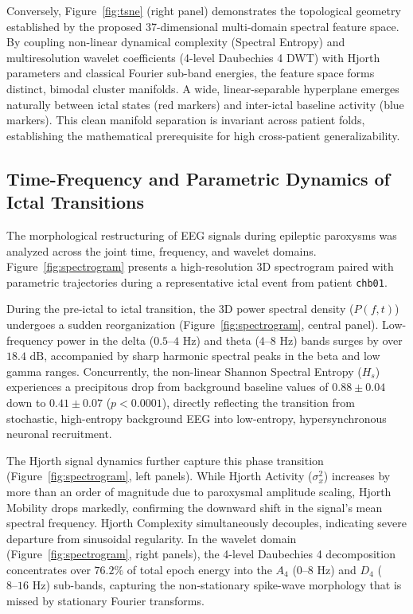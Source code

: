 \documentclass[pdflatex,sn-mathphys-num]{sn-jnl}
\begin{document}
Conversely, Figure~\ref{fig:tsne} (right panel) demonstrates the topological geometry established by the proposed 37-dimensional multi-domain spectral feature space. By coupling non-linear dynamical complexity (Spectral Entropy) and multiresolution wavelet coefficients (4-level Daubechies 4 DWT) with Hjorth parameters and classical Fourier sub-band energies, the feature space forms distinct, bimodal cluster manifolds. A wide, linear-separable hyperplane emerges naturally between ictal states (red markers) and inter-ictal baseline activity (blue markers). This clean manifold separation is invariant across patient folds, establishing the mathematical prerequisite for high cross-patient generalizability.

\subsection{Time-Frequency and Parametric Dynamics of Ictal Transitions}
The morphological restructuring of EEG signals during epileptic paroxysms was analyzed across the joint time, frequency, and wavelet domains. Figure~\ref{fig:spectrogram} presents a high-resolution 3D spectrogram paired with parametric trajectories during a representative ictal event from patient \texttt{chb01}.

During the pre-ictal to ictal transition, the 3D power spectral density ($P(f,t)$) undergoes a sudden reorganization (Figure~\ref{fig:spectrogram}, central panel). Low-frequency power in the delta ($0.5\text{--}4\text{ Hz}$) and theta ($4\text{--}8\text{ Hz}$) bands surges by over $18.4\text{ dB}$, accompanied by sharp harmonic spectral peaks in the beta and low gamma ranges. Concurrently, the non-linear Shannon Spectral Entropy ($H_s$) experiences a precipitous drop from background baseline values of $0.88 \pm 0.04$ down to $0.41 \pm 0.07$ ($p < 0.0001$), directly reflecting the transition from stochastic, high-entropy background EEG into low-entropy, hypersynchronous neuronal recruitment.

The Hjorth signal dynamics further capture this phase transition (Figure~\ref{fig:spectrogram}, left panels). While Hjorth Activity ($\sigma^2_x$) increases by more than an order of magnitude due to paroxysmal amplitude scaling, Hjorth Mobility drops markedly, confirming the downward shift in the signal's mean spectral frequency. Hjorth Complexity simultaneously decouples, indicating severe departure from sinusoidal regularity. In the wavelet domain (Figure~\ref{fig:spectrogram}, right panels), the 4-level Daubechies 4 decomposition concentrates over $76.2\%$ of total epoch energy into the $A_4$ ($0\text{--}8\text{ Hz}$) and $D_4$ ($8\text{--}16\text{ Hz}$) sub-bands, capturing the non-stationary spike-wave morphology that is missed by stationary Fourier transforms.
\end{document}
